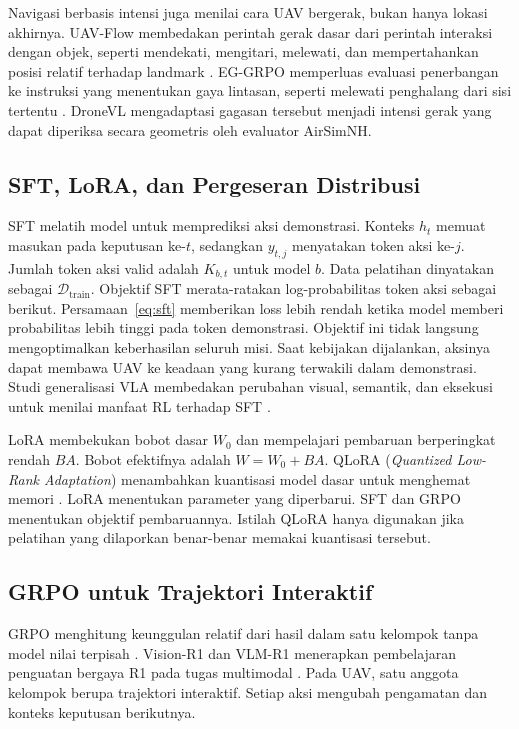 Navigasi berbasis intensi juga menilai cara UAV bergerak, bukan hanya lokasi akhirnya. UAV-Flow membedakan perintah gerak dasar dari perintah interaksi dengan objek, seperti mendekati, mengitari, melewati, dan mempertahankan posisi relatif terhadap landmark \citep{wang2025uavflow}. EG-GRPO memperluas evaluasi penerbangan ke instruksi yang menentukan gaya lintasan, seperti melewati penghalang dari sisi tertentu \citep{chen2026eggrpo}. DroneVL mengadaptasi gagasan tersebut menjadi intensi gerak yang dapat diperiksa secara geometris oleh evaluator AirSimNH.

\subsection{SFT, LoRA, dan Pergeseran Distribusi}
\label{subsec:lora_grpo}
SFT melatih model untuk memprediksi aksi demonstrasi. Konteks $h_t$ memuat masukan pada keputusan ke-$t$, sedangkan $y_{t,j}$ menyatakan token aksi ke-$j$. Jumlah token aksi valid adalah $K_{b,t}$ untuk model $b$. Data pelatihan dinyatakan sebagai $\mathcal D_{\mathrm{train}}$. Objektif SFT merata-ratakan log-probabilitas token aksi sebagai berikut.
Persamaan~\ref{eq:sft} memberikan loss lebih rendah ketika model memberi probabilitas lebih tinggi pada token demonstrasi. Objektif ini tidak langsung mengoptimalkan keberhasilan seluruh misi. Saat kebijakan dijalankan, aksinya dapat membawa UAV ke keadaan yang kurang terwakili dalam demonstrasi. Studi generalisasi VLA membedakan perubahan visual, semantik, dan eksekusi untuk menilai manfaat RL terhadap SFT \citep{liu2025rlvla}.

LoRA membekukan bobot dasar $W_0$ dan mempelajari pembaruan berperingkat rendah $BA$. Bobot efektifnya adalah $W=W_0+BA$. QLoRA (\textit{Quantized Low-Rank Adaptation}) menambahkan kuantisasi model dasar untuk menghemat memori \citep{hu2021lora,dettmers2023qlora}. LoRA menentukan parameter yang diperbarui. SFT dan GRPO menentukan objektif pembaruannya. Istilah QLoRA hanya digunakan jika pelatihan yang dilaporkan benar-benar memakai kuantisasi tersebut. %

\subsection{GRPO untuk Trajektori Interaktif}
\label{subsec:grpo}
GRPO menghitung keunggulan relatif dari hasil dalam satu kelompok tanpa model nilai terpisah \citep{shao2024deepseekmath}. Vision-R1 dan VLM-R1 menerapkan pembelajaran penguatan bergaya R1 pada tugas multimodal \citep{huang2025visionr1,shen2025vlmr1}. Pada UAV, satu anggota kelompok berupa trajektori interaktif. Setiap aksi mengubah pengamatan dan konteks keputusan berikutnya. %

